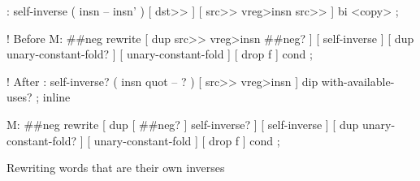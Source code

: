 \centering

  \begin{factorcode}
    : self-inverse ( insn -- insn' )
        [ dst>> ] [ src>> vreg>insn src>> ] bi <copy> ;

    ! Before
    M: ##neg rewrite
        {
            { [ dup src>> vreg>insn ##neg? ] [ self-inverse ] }
            { [ dup unary-constant-fold? ] [ unary-constant-fold ] }
            [ drop f ]
        } cond ;

    ! After
    : self-inverse? ( insn quot -- ? )
        [ src>> vreg>insn ] dip with-available-uses? ; inline

    M: ##neg rewrite
        {
            { [ dup [ ##neg? ] self-inverse? ] [ self-inverse ] }
            { [ dup unary-constant-fold? ] [ unary-constant-fold ] }
            [ drop f ]
        } cond ;
  \end{factorcode}

\caption{Rewriting words that are their own inverses}

